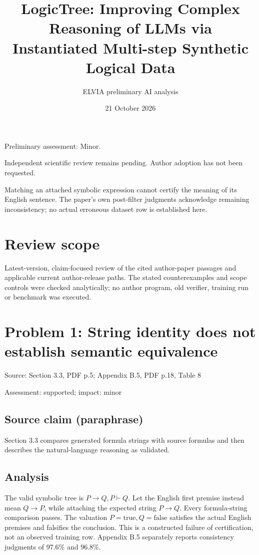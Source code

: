 \documentclass[11pt]{article}
\begin{document}
\title{LogicTree: Improving Complex Reasoning of LLMs via Instantiated Multi-step Synthetic Logical Data}

\author{ELVIA preliminary AI analysis}\date{21 October 2026}\maketitle

Preliminary assessment: Minor.\par

Independent scientific review remains pending. Author adoption has not been requested.

Matching an attached symbolic expression cannot certify the meaning of its English sentence. The paper’s own post-filter judgments acknowledge remaining inconsistency; no actual erroneous dataset row is established here.

\section*{Review scope}

Latest-version, claim-focused review of the cited author-paper passages and applicable current author-release paths. The stated counterexamples and scope controls were checked analytically; no author program, old verifier, training run or benchmark was executed.

\section*{Problem 1: String identity does not establish semantic equivalence}

Source: Section 3.3, PDF p.5; Appendix B.5, PDF p.18, Table 8

Assessment: supported; impact: minor

\subsection*{Source claim (paraphrase)}

Section 3.3 compares generated formula strings with source formulas and then describes the natural-language reasoning as validated.

\subsection*{Analysis}

The valid symbolic tree is \(P\to Q,P\vdash Q\). Let the English first premise instead mean \(Q\to P\), while attaching the expected string \(P\to Q\). Every formula-string comparison passes. The valuation \(P=\mathrm{true},Q=\mathrm{false}\) satisfies the actual English premises and falsifies the conclusion. This is a constructed failure of certification, not an observed training row. Appendix B.5 separately reports consistency judgments of \(97.6\%\) and \(96.8\%\).
\end{document}
